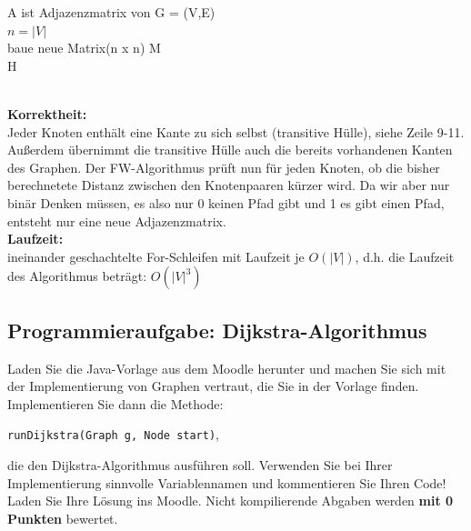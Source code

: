 \documentclass[paper=a4, fontsize=11pt]{scrartcl}
\numberwithin{equation}{section}
\numberwithin{figure}{section}
\numberwithin{table}{section}
\begin{document}
\begin{algorithm}[H]
\SetAlgoLined
A ist Adjazenzmatrix von G = (V,E) \\
$n=|V|$ \\
baue neue Matrix(n x n) M \\
\Return H 
\end{algorithm} \\

\textbf{Korrektheit:} \\
Jeder Knoten enthält eine Kante zu sich selbst (transitive Hülle), siehe Zeile 9-11. Außerdem übernimmt die transitive Hülle auch die bereits vorhandenen Kanten des Graphen. Der FW-Algorithmus prüft nun für jeden Knoten, ob die bisher berechnetete Distanz zwischen den Knotenpaaren kürzer wird. Da wir aber nur binär Denken müssen, es also nur 0 keinen Pfad gibt und 1 es gibt einen Pfad, entsteht nur eine neue Adjazenzmatrix. \\

\textbf{Laufzeit:} \\
ineinander geschachtelte For-Schleifen mit Laufzeit je $O(|V|)$, d.h. die Laufzeit des Algorithmus beträgt: $O(|V|^{3})$

\subsection{Programmieraufgabe: Dijkstra-Algorithmus}
Laden Sie die Java-Vorlage aus dem Moodle herunter und machen Sie sich mit der Implementierung von Graphen vertraut, die Sie in der Vorlage finden. Implementieren Sie dann die Methode:

\begin{center}
\texttt{runDijkstra(Graph g, Node start)},
\end{center}

\noindent die den Dijkstra-Algorithmus ausführen soll.
Verwenden Sie bei Ihrer Implementierung sinnvolle Variablennamen und kommentieren Sie Ihren Code!
Laden Sie Ihre Lösung ins Moodle. Nicht kompilierende Abgaben werden \textbf{mit 0 Punkten} bewertet.

\end{document}
